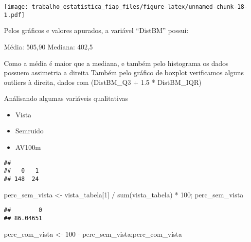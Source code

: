 \documentclass[
]{article}
\newenvironment{Shaded}{\begin{snugshade}}{\end{snugshade}}
\newcommand{\DecValTok}[1]{\textcolor[rgb]{0.00,0.00,0.81}{#1}}
\newcommand{\FunctionTok}[1]{\textcolor[rgb]{0.00,0.00,0.00}{#1}}
\newcommand{\NormalTok}[1]{#1}
\newcommand{\OtherTok}[1]{\textcolor[rgb]{0.56,0.35,0.01}{#1}}
\newcommand{\SpecialCharTok}[1]{\textcolor[rgb]{0.00,0.00,0.00}{#1}}
\providecommand{\tightlist}{%
  \setlength{\itemsep}{0pt}\setlength{\parskip}{0pt}}
\begin{document}
\texttt{[image: trabalho\_estatistica\_fiap\_files/figure-latex/unnamed-chunk-18-1.pdf]}

Pelos gráficos e valores apurados, a variável ``DistBM'' possui:

Média: 505,90 Mediana: 402,5

Como a média é maior que a mediana, e também pelo histograma os dados
possuem assimetria a direita Também pelo gráfico de boxplot verificamos
alguns outliers à direita, dados com (DistBM\_Q3 + 1.5 * DistBM\_IQR)

Análisando algumas variáveis qualitativas

\begin{itemize}
\tightlist
\item
  Vista
\item
  Semruido
\item
  AV100m
\end{itemize}

\begin{Shaded}
\end{Shaded}

\begin{verbatim}
## 
##   0   1 
## 148  24
\end{verbatim}

\begin{Shaded}
\begin{Highlighting}[]
\NormalTok{perc\_sem\_vista }\OtherTok{\textless{}{-}}\NormalTok{ vista\_tabela[}\DecValTok{1}\NormalTok{] }\SpecialCharTok{/} \FunctionTok{sum}\NormalTok{(vista\_tabela) }\SpecialCharTok{*} \DecValTok{100}\NormalTok{; perc\_sem\_vista}
\end{Highlighting}
\end{Shaded}

\begin{verbatim}
##        0 
## 86.04651
\end{verbatim}

\begin{Shaded}
\begin{Highlighting}[]
\NormalTok{perc\_com\_vista }\OtherTok{\textless{}{-}} \DecValTok{100} \SpecialCharTok{{-}}\NormalTok{ perc\_sem\_vista;perc\_com\_vista}
\end{Highlighting}
\end{Shaded}
\end{document}
